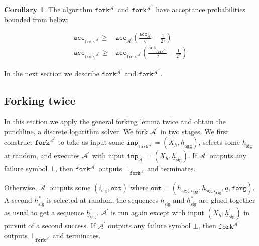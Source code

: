\documentclass{iacrtrans}
\theoremstyle{definition}
\numberwithin{theorem}{subsection}
\numberwithin{lemma}{theorem}
\newtheorem{cor}[theorem]{Corollary}
\newcommand{\adversary}{\mathcal{A}}
\begin{document}
\begin{cor}
The algorithm $\texttt{fork}^{\adversary^\prime}$ and  $\texttt{fork}^{\adversary^{\prime \prime}}$ have acceptance probabilities bounded from below:

\begin{align*}
\texttt{acc}_{\texttt{fork}^{\adversary^\prime}} \geq& \texttt{acc}_{\adversary^\prime} \left(\frac{\texttt{acc}_{\adversary^\prime}}{q} - \frac{1}{2^\eta}\right) \\
\texttt{acc}_{\texttt{fork}^{\adversary^{\prime \prime}}} \geq& \texttt{acc}_{\texttt{fork}^{\adversary^\prime}} \left(\frac{\texttt{acc}_{\texttt{fork}^{\adversary^\prime}}}{q} - \frac{1}{2^\eta}\right)
\end{align*}
\end{cor} In the next section we describe $\texttt{fork}^{\adversary^\prime}$ and $\texttt{fork}^{\adversary^{\prime \prime}}$.

\subsection{Forking twice}\label{forkingTwice}

In this section we apply the general forking lemma twice and obtain the punchline, a discrete logarithm solver. We fork $\adversary^\prime$ in two stages. We first construct $\texttt{fork}^{\adversary^\prime}$ to take as input some $\texttt{inp}_{\texttt{fork}^{\adversary^\prime}} = (X_h, \underline{h}_{\text{agg}})$,  selects some $\underline{h}_{\text{sig}}$ at random, and executes $\adversary^\prime$ with input $\texttt{inp}_{\adversary^\prime} = (X_h, \underline{h}_{\text{sig}})$. If $\adversary^\prime$ outputs any failure symbol $\bot$, then $\texttt{fork}^{\adversary^\prime}$ outputs $\bot_{\texttt{fork}^{\adversary^\prime}}$ and terminates.

Otherwise, $\adversary^\prime$ outputs some $(i_{\text{sig}}, \texttt{out})$ where $\texttt{out} = (h_{\text{agg}, i_{\texttt{agg}}}, h_{\text{sig}, i_{\texttt{sig}}}, \underline{a}, \texttt{forg})$. A second $\underline{h}_{\text{sig}}^*$ is selected at random, the sequences $\underline{h}_{\text{sig}}$ and $\underline{h}_{\text{sig}}^*$ are glued together as usual to get a sequence $\underline{h}_{\text{sig}}^\prime$. $\adversary^\prime$ is run again except with input $(X_h, \underline{h}_{\text{sig}}^\prime)$ in pursuit of a second success.  If $\adversary^\prime$ outputs any failure symbol $\bot$, then $\texttt{fork}^{\adversary^\prime}$ outputs $\bot_{\texttt{fork}^{\adversary^\prime}}$ and terminates.
\end{document}
